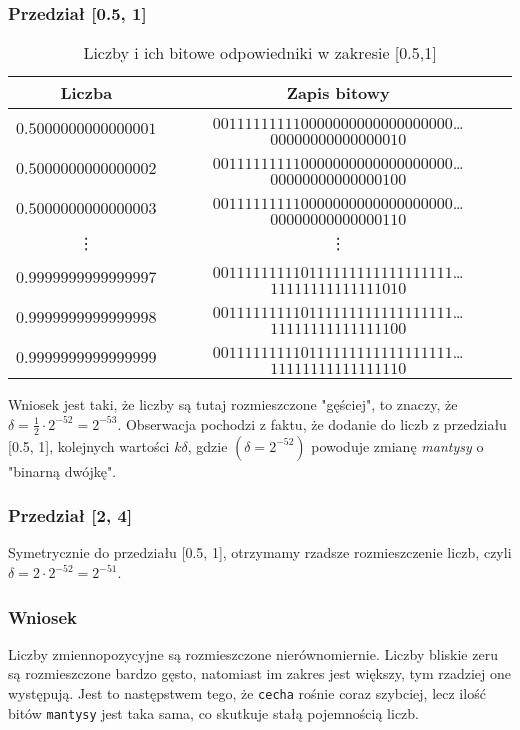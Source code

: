 \documentclass{article}
\begin{document}
            \subsubsection{Przedział [0.5, 1]}
                {\small
                \begin{table}[h!]
                \centering
                \begin{tabular}{c c}
                    \hline
                     Liczba & Zapis bitowy\\
                     \hline
$0.5000000000000001$ & $001111111110000000000000000000$\dots$00000000000000010$\\
$0.5000000000000002$ & $001111111110000000000000000000$\dots$00000000000000100$\\
$0.5000000000000003$ & $001111111110000000000000000000$\dots$00000000000000110$\\
\vdots & \vdots \\
$0.9999999999999997$ & $001111111110111111111111111111$\dots$11111111111111010$\\
$0.9999999999999998$ & $001111111110111111111111111111$\dots$11111111111111100$\\
$0.9999999999999999$ & $001111111110111111111111111111$\dots$11111111111111110$\\
                \hline
                \end{tabular}
                \caption{Liczby i ich bitowe odpowiedniki w zakresie [0.5,1]}
                \label{table:range:halfone}
                \end{table}
                }
                
                Wniosek jest taki, że liczby są tutaj rozmieszczone "gęściej", to znaczy, że $\delta=\frac{1}{2}\cdot2^{-52} = 2^{-53}$. Obserwacja pochodzi z faktu, że dodanie do liczb z przedziału [0.5, 1], kolejnych wartości $k\delta$, gdzie $(\delta=2^{-52})$ powoduje zmianę \textit{mantysy} o "binarną dwójkę".
            \subsubsection{Przedział [2, 4]}
                Symetrycznie do przedziału [0.5, 1], otrzymamy rzadsze rozmieszczenie liczb, czyli $\delta=2\cdot2^{-52}=2^{-51}$.
            \subsubsection{Wniosek}
                Liczby zmiennopozycyjne są rozmieszczone nierównomiernie. Liczby bliskie zeru są rozmieszczone bardzo gęsto, natomiast im zakres jest większy, tym rzadziej one występują. Jest to następstwem tego, że \texttt{cecha} rośnie coraz szybciej, lecz ilość bitów \texttt{mantysy} jest taka sama, co skutkuje stałą pojemnością liczb.
                
\end{document}
